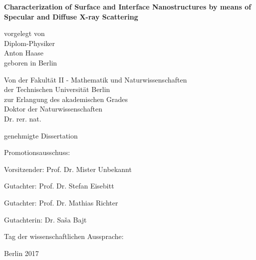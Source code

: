 
\begin{titlepage}
{\noindent\sffamily\large%
    \begin{center}
        \vspace*{3ex}
        {\LARGE\bfseries\sffamily
           Characterization of Surface and Interface Nanostructures by means of Specular and Diffuse X-ray Scattering
        }
        \vspace{1cm}

        vorgelegt von \\
        Diplom-Physiker \\
        Anton Haase \\
        geboren in Berlin \\
        \vspace{4cm}

        Von der Fakultät II - Mathematik und Naturwissenschaften \\
        der Technischen Universität Berlin \\
        zur Erlangung des akademischen Grades \\
        Doktor der Naturwissenschaften \\
        Dr. rer. nat. \\
        \vspace{3ex}

        genehmigte Dissertation \\
        \vspace{2cm}
    \end{center}

    Promotionsausschuss:
    \vspace{2ex}

    Vorsitzender: Prof. Dr. Mister Unbekannt

    Gutachter: Prof. Dr. Stefan Eisebitt

    Gutachter: Prof. Dr. Mathias Richter

    Gutachterin: Dr. Sa\v{s}a Bajt
    \vspace{1ex}

    Tag der wissenschaftlichen Aussprache:

    \vfill
    \begin{center}
        Berlin 2017
    \end{center}
}
\end{titlepage}

\cleardoublepage

